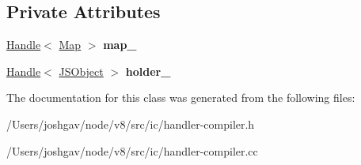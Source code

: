 \subsection*{Private Attributes}
\begin{DoxyCompactItemize}
\item 
\hyperlink{classv8_1_1internal_1_1_handle}{Handle}$<$ \hyperlink{classv8_1_1internal_1_1_map}{Map} $>$ {\bfseries map\+\_\+}\hypertarget{classv8_1_1internal_1_1_property_handler_compiler_ad07323ad48c8f4f03a1455897f273e79}{}\label{classv8_1_1internal_1_1_property_handler_compiler_ad07323ad48c8f4f03a1455897f273e79}

\item 
\hyperlink{classv8_1_1internal_1_1_handle}{Handle}$<$ \hyperlink{classv8_1_1internal_1_1_j_s_object}{J\+S\+Object} $>$ {\bfseries holder\+\_\+}\hypertarget{classv8_1_1internal_1_1_property_handler_compiler_ab520ff87caf733750cf20f37ef025df3}{}\label{classv8_1_1internal_1_1_property_handler_compiler_ab520ff87caf733750cf20f37ef025df3}

\end{DoxyCompactItemize}


The documentation for this class was generated from the following files\+:\begin{DoxyCompactItemize}
\item 
/\+Users/joshgav/node/v8/src/ic/handler-\/compiler.\+h\item 
/\+Users/joshgav/node/v8/src/ic/handler-\/compiler.\+cc\end{DoxyCompactItemize}
